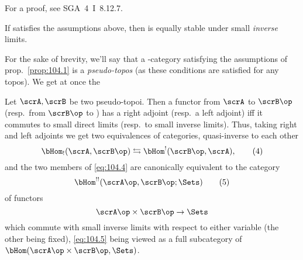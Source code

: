 For a proof, see SGA~4~I~8.12.7.

\begin{corollarynum}\label{cor:104.prop1.1}
  If \scrA{} satisfies the assumptions above, then \scrA{} is equally
  stable under small \emph{inverse} limits.
\end{corollarynum}

For the sake of brevity, we'll say that a \scrU-category
satisfying the assumptions of prop.\ \ref{prop:104.1} is a
\emph{pseudo-topos} (as these conditions are satisfied for any
topos). We get at once the
\begin{corollarynum}\label{cor:104.prop1.2}
  Let $\scrA,\scrB$ be two pseudo-topoi. Then a functor from $\scrA$
  to $\scrB\op$ \textup(resp.\ from $\scrB\op$ to \scrA\textup) has a
  right adjoint \textup(resp.\ a left adjoint\textup) if{f} it
  commutes to small direct limits \textup(resp.\ to small inverse
  limits\textup). Thus, taking right and left adjoints we get two
  equivalences of categories, quasi-inverse to each other
  \begin{equation}
    \label{eq:104.4}
    \bHom_!(\scrA,\scrB\op)\leftrightarrows\bHom^!(\scrB\op,\scrA),\tag{4}
  \end{equation}
  and the two members of \eqref{eq:104.4} are canonically equivalent
  to the category
  \begin{equation}
    \label{eq:104.5}
    \bHom^{!!}(\scrA\op,\scrB\op; \Sets)\tag{5}
  \end{equation}
  of functors
  \[\scrA\op\times\scrB\op\to\Sets\]
  which commute with small inverse limits with respect to either
  variable \textup(the other being fixed\kern1pt\textup), \eqref{eq:104.5}
  being viewed as a full subcategory of $\bHom(\scrA\op\times\scrB\op,
  \Sets)$.
\end{corollarynum}
